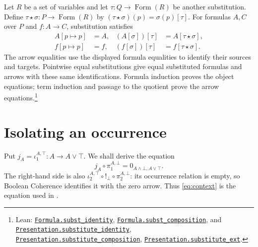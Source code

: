 \documentclass[11pt]{article}
\newcommand{\FormulaSet}{\operatorname{Form}}
\begin{document}
Let $R$ be a set of variables and let
$\tau:Q\to\FormulaSet(R)$ be another substitution. Define
$\tau\star\sigma:P\to\FormulaSet(R)$ by
$(\tau\star\sigma)(p)=\sigma(p)[\tau]$. For formulas $A,C$ over
$P$ and $f:A\to C$, substitution satisfies
\[
 \begin{aligned}
 A[p\mapsto p]&=A,&
 (A[\sigma])[\tau]&=A[\tau\star\sigma],\\
 f[p\mapsto p]&=f,&
 (f[\sigma])[\tau]&=f[\tau\star\sigma].
 \end{aligned}
\]
The arrow equalities use the displayed formula equalities to
identify their sources and targets. Pointwise equal substitutions
give equal substituted formulas and arrows with these same
identifications. Formula induction proves the object equations;
term induction and passage to the quotient prove the arrow
equations.\footnote{\raggedright Lean:
\href{https://github.com/flengyel/Dosen-Petric-Maximality/blob/5dbee39bea09539bd130f729e82636419f71f920/DosenPetric/FormulaSubstitutionLaws.lean\#L11}{\texttt{Formula.\allowbreak{}subst\_identity}},
\href{https://github.com/flengyel/Dosen-Petric-Maximality/blob/5dbee39bea09539bd130f729e82636419f71f920/DosenPetric/FormulaSubstitutionLaws.lean\#L20}{\texttt{Formula.\allowbreak{}subst\_composition}}, and
\href{https://github.com/flengyel/Dosen-Petric-Maximality/blob/5dbee39bea09539bd130f729e82636419f71f920/DosenPetric/PresentationSubstitutionActionQuotient.lean\#L39}{\texttt{Presentation.\allowbreak{}substitute\_identity}},
\href{https://github.com/flengyel/Dosen-Petric-Maximality/blob/5dbee39bea09539bd130f729e82636419f71f920/DosenPetric/PresentationSubstitutionActionQuotient.lean\#L44}{\texttt{Presentation.\allowbreak{}substitute\_composition}},
\href{https://github.com/flengyel/Dosen-Petric-Maximality/blob/5dbee39bea09539bd130f729e82636419f71f920/DosenPetric/PresentationSubstitutionActionQuotient.lean\#L57}{\texttt{Presentation.\allowbreak{}substitute\_ext}}.}

\section{Isolating an occurrence}\label{sec:isolation}

Put $j_A=\iota_1^{A,\top}:A\to A\vee\top$. We shall derive the equation
\begin{equation}
 j_A\circ\pi_1^{A,\bot}
   =0_{A\wedge\bot,A\vee\top}.
 \tag{$K_A$}\label{eq:context}
\end{equation}
The right-hand side is also
$\iota_2^{A,\top}\circ!_\bot\circ\pi_2^{A,\bot}$: its occurrence
relation is empty, so Boolean Coherence identifies it with the zero
arrow. Thus \eqref{eq:context} is the equation used in
\cite[\S9.7, pp.~215--216]{DP}.
\end{document}
